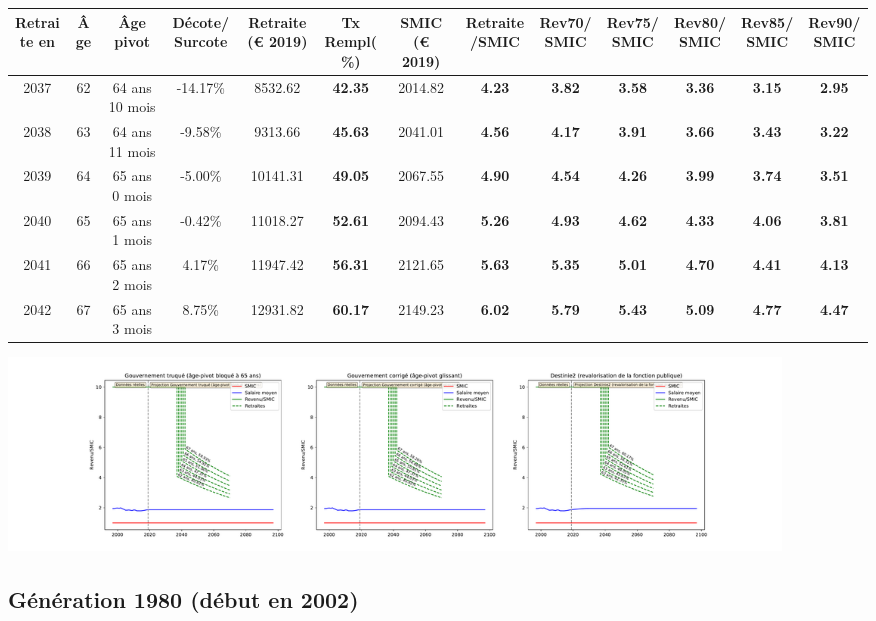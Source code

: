 { \scriptsize \begin{center} 
\begin{tabular}[htb]{|c|c||c|c||c|c||c||c|c|c|c|c|c|} 
\hline 
 Retraite en &  Âge &  Âge pivot &  Décote/Surcote &  Retraite (\euro{} 2019) &  Tx Rempl(\%) &  SMIC (\euro{} 2019) &  Retraite/SMIC &  Rev70/SMIC &  Rev75/SMIC &  Rev80/SMIC &  Rev85/SMIC &  Rev90/SMIC \\ 
\hline \hline 
 2037 &  62 &  64 ans 10 mois &  -14.17\% &  8532.62 &  {\bf 42.35} &  2014.82 &  {\bf 4.23} &  {\bf 3.82} &  {\bf 3.58} &  {\bf 3.36} &  {\bf 3.15} &  {\bf 2.95} \\ 
\hline 
 2038 &  63 &  64 ans 11 mois &  -9.58\% &  9313.66 &  {\bf 45.63} &  2041.01 &  {\bf 4.56} &  {\bf 4.17} &  {\bf 3.91} &  {\bf 3.66} &  {\bf 3.43} &  {\bf 3.22} \\ 
\hline 
 2039 &  64 &  65 ans 0 mois &  -5.00\% &  10141.31 &  {\bf 49.05} &  2067.55 &  {\bf 4.90} &  {\bf 4.54} &  {\bf 4.26} &  {\bf 3.99} &  {\bf 3.74} &  {\bf 3.51} \\ 
\hline 
 2040 &  65 &  65 ans 1 mois &  -0.42\% &  11018.27 &  {\bf 52.61} &  2094.43 &  {\bf 5.26} &  {\bf 4.93} &  {\bf 4.62} &  {\bf 4.33} &  {\bf 4.06} &  {\bf 3.81} \\ 
\hline 
 2041 &  66 &  65 ans 2 mois &  4.17\% &  11947.42 &  {\bf 56.31} &  2121.65 &  {\bf 5.63} &  {\bf 5.35} &  {\bf 5.01} &  {\bf 4.70} &  {\bf 4.41} &  {\bf 4.13} \\ 
\hline 
 2042 &  67 &  65 ans 3 mois &  8.75\% &  12931.82 &  {\bf 60.17} &  2149.23 &  {\bf 6.02} &  {\bf 5.79} &  {\bf 5.43} &  {\bf 5.09} &  {\bf 4.77} &  {\bf 4.47} \\ 
\hline 
\hline 
\end{tabular} 
\end{center} } 

 \begin{center}\includegraphics[width=0.9\textwidth]{fig/Riche_1975_22_dest_retraite.pdf}\end{center} \label{fig/Riche_1975_22_dest_retraite.pdf} 

\newpage 
 
\subsection{Génération 1980 (début en 2002)} 


